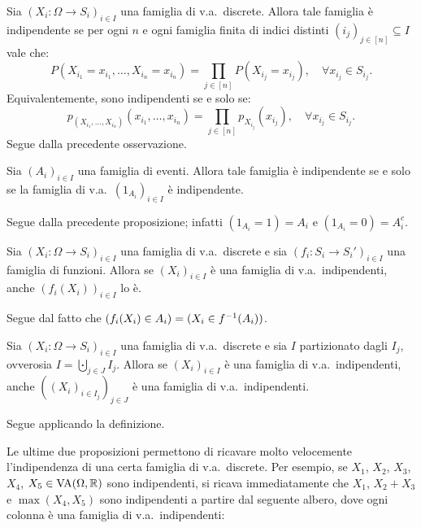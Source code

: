 \begin{multicols*}{2}
\begin{proposition}
    Sia $(X_i : \Omega \to S_i)_{i \in I}$ una famiglia di v.a.~discrete. Allora
    tale famiglia è indipendente se per ogni $n$ e ogni famiglia finita di
    indici distinti $(i_j)_{j \in [n]} \subseteq I$ vale che:
    \[
        P(X_{i_1} = x_{i_1}, \ldots, X_{i_n} = x_{i_n}) = \prod_{j \in [n]} P(X_{i_j} = x_{i_j}), \quad \forall x_{i_j} \in S_{i_j}.
    \]
    Equivalentemente, sono indipendenti se e solo se:
    \[
        p_{(X_{i_1}, \ldots, X_{i_n})}(x_{i_1}, \ldots, x_{i_n}) = \prod_{j \in [n]} p_{X_{i_j}}(x_{i_j}), \quad \forall x_{i_j} \in S_{i_j}.
    \]
    Segue dalla precedente osservazione.
\end{proposition}

\begin{proposition}
    Sia $(A_i)_{i \in I}$ una famiglia di eventi. Allora tale famiglia
    è indipendente se e solo se la famiglia di v.a.~$(1_{A_i})_{i \in I}$ è
    indipendente. \smallskip


    Segue dalla precedente proposizione; infatti $(1_{A_i} = 1) = A_i$ e
    $(1_{A_i} = 0) = A_i^c$.
\end{proposition}

\begin{proposition}
    \label{prop:indipendenza_composizione}
    Sia $(X_i : \Omega \to S_i)_{i \in I}$ una famiglia di v.a.~discrete e
    sia $(f_i : S_i \to S_{i}')_{i \in I}$ una famiglia di funzioni. Allora
    se $(X_i)_{i \in I}$ è una famiglia di v.a.~indipendenti, anche
    $(f_i(X_i))_{i \in I}$ lo è. \smallskip


    Segue dal fatto che $(f_i(X_i) \in A_i) = (X_i \in f^{-1}(A_i))$.
\end{proposition}

\begin{proposition}
    \label{prop:indipendenza_partizione}
    Sia $(X_i : \Omega \to S_i)_{i \in I}$ una famiglia di v.a.~discrete e
    sia $I$ partizionato dagli $I_j$, ovverosia $I = \bigcupdot_{j \in J} I_j$.
    Allora se $(X_i)_{i \in I}$ è una famiglia di v.a.~indipendenti, anche
    $((X_i)_{i \in I_j})_{j \in J}$ è una famiglia di v.a.~indipendenti. \smallskip


    Segue applicando la definizione.
\end{proposition}

\begin{remark}
    Le ultime due proposizioni permettono di ricavare molto velocemente l'indipendenza
    di una certa famiglia di v.a.~discrete. Per esempio, se
    $X_1$, $X_2$, $X_3$, $X_4$, $X_5 \in \operatorname{VA}(\Omega, \mathbb{R})$ sono indipendenti,
    si ricava immediatamente che $X_1$, $X_2 + X_3$ e $\max(X_4, X_5)$ sono
    indipendenti a partire dal seguente albero, dove ogni colonna è una famiglia
    di v.a.~indipendenti:


\end{remark}
\end{multicols*}
